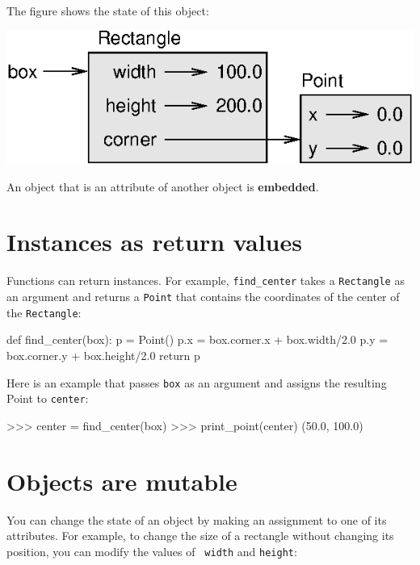The figure shows the state of this object:


\beforefig
\centerline{\includegraphics{figs/rectangle.eps}}
\afterfig

An object that is an attribute of another object is {\bf embedded}.



\section{Instances as return values}


Functions can return instances.  For example, \verb"find_center"
takes a {\tt Rectangle} as an argument and returns a {\tt Point}
that contains the coordinates of the center of the {\tt Rectangle}:

\beforeverb
\begin{pycode}
def find_center(box):
    p = Point()
    p.x = box.corner.x + box.width/2.0
    p.y = box.corner.y + box.height/2.0
    return p
\end{pycode}
\afterverb
%
Here is an example that passes {\tt box} as an argument and assigns
the resulting Point to {\tt center}:

\beforeverb
\begin{pyinterpreter}
>>> center = find_center(box)
>>> print_point(center)
(50.0, 100.0)
\end{pyinterpreter}
\afterverb
%

\section{Objects are mutable}


You can change the state of an object by making an assignment to one of
its attributes.  For example, to change the size of a rectangle
without changing its position, you can modify the values of {\tt
width} and {\tt height}:

